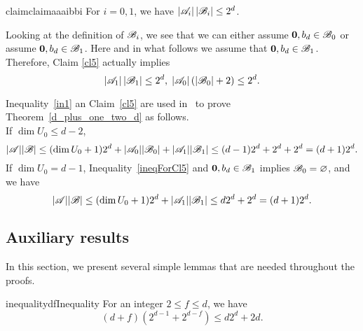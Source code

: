 \begin{restatable}{claim}{claimaaaibbi}\label{cl5}
    For $i=0, 1$, we have $\left|{\mathscr{A}}_i\right|\left|{\mathscr{B}}_i\right| \leq 2^d$.
\end{restatable}


\noindent Looking at the definition of ${\mathscr{B}}_i$, we see that we can either assume  $\mathbf{0}, b_d \in {\mathscr{B}}_0$ or assume $\mathbf{0}, b_d \in {\mathscr{B}}_1$. Here and in what follows we assume that $\mathbf{0}, b_d \in {\mathscr{B}}_1$. Therefore, Claim \ref{cl5} actually implies
\begin{equation}\label{stronger5}
    \left|{\mathscr{A}}_1\right|\left|{\mathscr{B}}_1\right| \leq 2^d,\; \left|{\mathscr{A}}_0\right|\left(\left|{\mathscr{B}}_0\right|+2\right)\leq 2^d.
\end{equation}

\noindent Inequality~\ref{in1} an Claim~\ref{cl5} are used in~\cite{kupavskii22} to prove Theorem~\ref{d_plus_one_two_d} as follows.\\ 
If $\operatorname{dim}U_0 \leq d-2$, 
\begin{equation}\label{final-old-step-smalldim}
    |{\mathscr{A}}| |{\mathscr{B}}| \leq (\operatorname{dim}U_0 + 1)2^d + |{\mathscr{A}}_0||{\mathscr{B}}_0|+|{\mathscr{A}}_1||{\mathscr{B}}_1| \leq (d-1)2^d + 2^d + 2^d = (d+1)2^d.
\end{equation}
If $\operatorname{dim}U_0 = d-1$, Inequality~\ref{ineqForCl5} and $\mathbf{0}, b_d \in {\mathscr{B}}_1$ implies ${\mathscr{B}}_0 = \varnothing$, and we have
\begin{equation}\label{final-old-step-d-1}
    |{\mathscr{A}}| |{\mathscr{B}}| \leq (\operatorname{dim}U_0 + 1)2^d + |{\mathscr{A}}_1||{\mathscr{B}}_1| \leq d 2^d + 2^d = (d+1)2^d.
\end{equation}

\subsection{Auxiliary results}
In this section, we present several simple lemmas that are needed throughout the proofs. 
\begin{restatable}{inequality}{dfInequality}\label{in2}
    For an integer $2\leq f\leq d$, we have \[(d+f)(2^{d-1}+2^{d-f})\leq d2^d + 2d.\]
\end{restatable}

